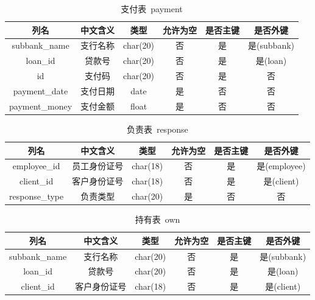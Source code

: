 \documentclass{article}
\begin{document}
    \begin{table}[H]
        \centering
        \caption{支付表\ payment}
        \begin{tabular}{cccccc}
            \hline
            列名 & 中文含义 & 类型 & 允许为空 & 是否主键 & 是否外键 \\
            \hline
            subbank\_name & 支行名称 & char(20) & 否 & 是 & 是(subbank) \\
            loan\_id & 贷款号 & char(20) & 否 & 是 & 是(loan) \\
            id & 支付码 & char(20) & 否 & 是 & 否 \\
            payment\_date & 支付日期 & date & 是 & 否 & 否 \\
            payment\_money & 支付金额 & float & 是 & 否 & 否 \\
            \hline
        \end{tabular}
    \end{table}
    \begin{table}[H]
        \centering
        \caption{负责表\ response}
        \begin{tabular}{cccccc}
            \hline
            列名 & 中文含义 & 类型 & 允许为空 & 是否主键 & 是否外键 \\
            \hline
            employee\_id & 员工身份证号 & char(18) & 否 & 是 & 是(employee) \\
            client\_id & 客户身份证号 & char(18) & 否 & 是 & 是(client) \\
            response\_type & 负责类型 & char(20) & 是 & 否 & 否 \\
            \hline
        \end{tabular}
    \end{table}
    \begin{table}[H]
        \centering
        \caption{持有表\ own}
        \begin{tabular}{cccccc}
            \hline
            列名 & 中文含义 & 类型 & 允许为空 & 是否主键 & 是否外键 \\
            \hline
            subbank\_name & 支行名称 & char(20) & 否 & 是 & 是(subbank) \\
            loan\_id & 贷款号 & char(20) & 否 & 是 & 是(loan) \\
            client\_id & 客户身份证号 & char(18) & 否 & 是 & 是(client) \\
            \hline
        \end{tabular}
    \end{table}
    
\end{document}
